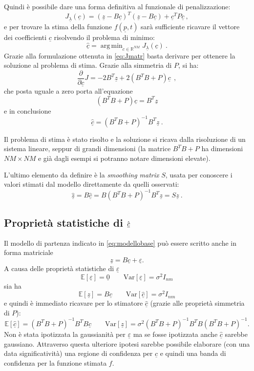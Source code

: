 \documentclass[a4paper,11pt,twoside,openright]{book}							%
\DeclareMathOperator*{\argmin}{arg\,min}
\begin{document}
Quindi è possibile dare una forma definitiva al funzionale di penalizzazione:
\begin{equation} 
\label{eq:Jmatr}
J_{\underline \lambda }(\underline c) = (\underline z - B \underline c)^T (\underline z - B \underline c) + \underline c^T P \underline c \ ,
\end{equation}
e per trovare la stima della funzione $f(\underline{p},t)$ sarà sufficiente ricavare il vettore dei coefficienti $\underline c$ risolvendo il problema di minimo:
$$
\hat{\underline{c}}=\argmin_{c \in \mathbb{R}^{NM}} J_{\underline \lambda }(\underline c) \ .
$$
Grazie alla formulazione ottenuta in \ref{eq:Jmatr} basta derivare per ottenere la soluzione al problema di stima. Grazie alla simmetria di $P$, si ha:
$$
\frac{\partial}{\partial \underline c}J= -2 B^T \underline z + 2(B^T B + P) \underline c \ \ ,
$$
che posta uguale a zero porta all'equazione
$$
(B^T B + P) \underline c = B^T\underline z
$$ 
e in conclusione
$$ \hat  {\underline c} = (B^T B + P)^{-1}B^T \underline z \ .$$

Il problema di stima è stato risolto e la soluzione si ricava dalla risoluzione di un sistema lineare, seppur di grandi dimensioni (la matrice $B^T B + P$ ha dimensioni $NM \times NM$ e già dagli esempi si potranno notare dimensioni elevate).

L'ultimo elemento da definire è la \textit{smoothing matrix} $S$, usata per conoscere i valori stimati dal modello direttamente da quelli osservati:
$$
\hat  {\underline z} =B\hat  {\underline c} = B(B^T B + P)^{-1}B^T \underline z = S\underline{z} \ .
$$



\subsection{Proprietà statistiche di $\hat  {\protect\underline{c}}$}
Il modello di partenza indicato in \ref{eq:modellobase} può essere scritto anche in forma matriciale
\begin{equation}
\label{eq:modellobasematric}
\underline z=B \underline c + \underline \varepsilon .
\end{equation}
A causa delle proprietà statistiche di $\underline \varepsilon$
$$
\mathbb{E}[\underline \varepsilon] = \underline 0 \qquad \mathrm{Var}[\underline \varepsilon] = \sigma^2 I_{nm}
$$
sia ha
$$
\mathbb{E}[\underline z] = B \underline c \qquad \mathrm{Var}[\hat  {\underline c}] = \sigma^2 I_{nm}
$$
e quindi è immediato ricavare per lo stimatore $\hat  {\underline c}$ (grazie alle proprietà simmetria di $P$):
$$
\mathbb{E}[\hat  {\underline c}] = (B^T B + P)^{-1}B^TB \underline c \qquad \mathrm{Var}[\underline z] = \sigma^2 (B^T B + P)^{-1}B^TB(B^T B + P)^{-1} .
$$
Non è stata ipotizzata la gaussianità per $\underline \varepsilon$ ma se fosse ipotizzata anche $\hat  {\underline c}$ sarebbe gaussiano. Attraverso questa ulteriore ipotesi sarebbe possibile elaborare (con una data significatività) una regione di confidenza per $\hat  {\underline c}$ e quindi una banda di confidenza per la funzione stimata $f$.
\end{document}
